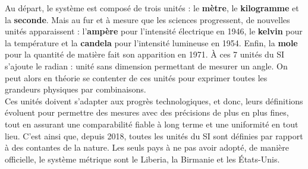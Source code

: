 Au départ, le système est composé de trois unités : le {\bf mètre}, le {\bf kilogramme} et la {\bf seconde}. Mais au fur et à mesure que les sciences progressent, de nouvelles unités apparaissent : l'{\bf ampère} pour l'intensité électrique en 1946, le {\bf kelvin} pour la température et la {\bf candela} pour l'intensité lumineuse en 1954. Enfin, la {\bf mole} pour la quantité de matière fait son apparition en 1971. À ces 7 unités du SI s'ajoute le radian : unité sans dimension permettant de mesurer un angle. On peut alors en théorie se contenter de ces unités pour exprimer toutes les grandeurs physiques par combinaisons. \\
Ces unités doivent s’adapter aux progrès technologiques, et donc,  leurs définitions évoluent pour permettre des mesures avec des précisions de plus en plus fines, tout en assurant une comparabilité fiable à long terme et une uniformité en tout lieu. C'est ainsi que, depuis 2018, toutes les unités du SI sont définies par rapport à des contantes de la nature. Les seuls pays à ne pas avoir adopté, de manière officielle, le système métrique sont le Liberia, la Birmanie et les États-Unis.

